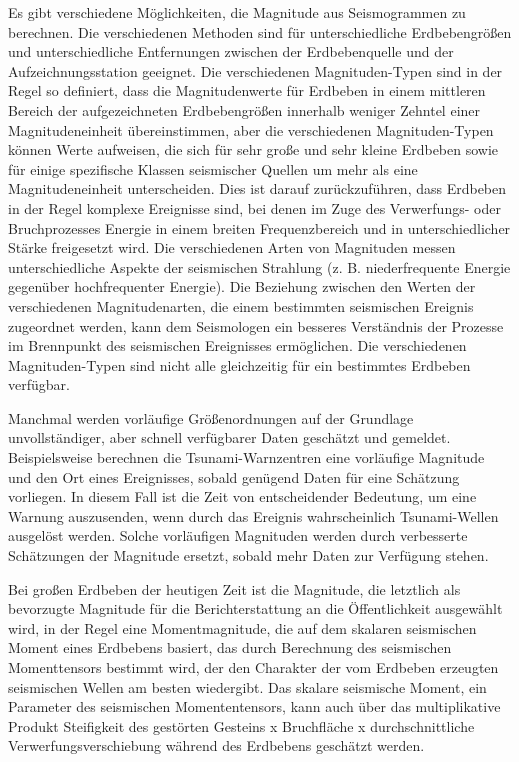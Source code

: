 \documentclass[
]{article}
\begin{document}
Es gibt verschiedene Möglichkeiten, die Magnitude aus Seismogrammen zu
berechnen. Die verschiedenen Methoden sind für unterschiedliche
Erdbebengrößen und unterschiedliche Entfernungen zwischen der
Erdbebenquelle und der Aufzeichnungsstation geeignet. Die verschiedenen
Magnituden-Typen sind in der Regel so definiert, dass die
Magnitudenwerte für Erdbeben in einem mittleren Bereich der
aufgezeichneten Erdbebengrößen innerhalb weniger Zehntel einer
Magnitudeneinheit übereinstimmen, aber die verschiedenen
Magnituden-Typen können Werte aufweisen, die sich für sehr große und
sehr kleine Erdbeben sowie für einige spezifische Klassen seismischer
Quellen um mehr als eine Magnitudeneinheit unterscheiden. Dies ist
darauf zurückzuführen, dass Erdbeben in der Regel komplexe Ereignisse
sind, bei denen im Zuge des Verwerfungs- oder Bruchprozesses Energie in
einem breiten Frequenzbereich und in unterschiedlicher Stärke
freigesetzt wird. Die verschiedenen Arten von Magnituden messen
unterschiedliche Aspekte der seismischen Strahlung (z. B.
niederfrequente Energie gegenüber hochfrequenter Energie). Die Beziehung
zwischen den Werten der verschiedenen Magnitudenarten, die einem
bestimmten seismischen Ereignis zugeordnet werden, kann dem Seismologen
ein besseres Verständnis der Prozesse im Brennpunkt des seismischen
Ereignisses ermöglichen. Die verschiedenen Magnituden-Typen sind nicht
alle gleichzeitig für ein bestimmtes Erdbeben verfügbar.

Manchmal werden vorläufige Größenordnungen auf der Grundlage
unvollständiger, aber schnell verfügbarer Daten geschätzt und gemeldet.
Beispielsweise berechnen die Tsunami-Warnzentren eine vorläufige
Magnitude und den Ort eines Ereignisses, sobald genügend Daten für eine
Schätzung vorliegen. In diesem Fall ist die Zeit von entscheidender
Bedeutung, um eine Warnung auszusenden, wenn durch das Ereignis
wahrscheinlich Tsunami-Wellen ausgelöst werden. Solche vorläufigen
Magnituden werden durch verbesserte Schätzungen der Magnitude ersetzt,
sobald mehr Daten zur Verfügung stehen.

Bei großen Erdbeben der heutigen Zeit ist die Magnitude, die letztlich
als bevorzugte Magnitude für die Berichterstattung an die Öffentlichkeit
ausgewählt wird, in der Regel eine Momentmagnitude, die auf dem skalaren
seismischen Moment eines Erdbebens basiert, das durch Berechnung des
seismischen Momenttensors bestimmt wird, der den Charakter der vom
Erdbeben erzeugten seismischen Wellen am besten wiedergibt. Das skalare
seismische Moment, ein Parameter des seismischen Momententensors, kann
auch über das multiplikative Produkt Steifigkeit des gestörten Gesteins
x Bruchfläche x durchschnittliche Verwerfungsverschiebung während des
Erdbebens geschätzt werden.
\end{document}
